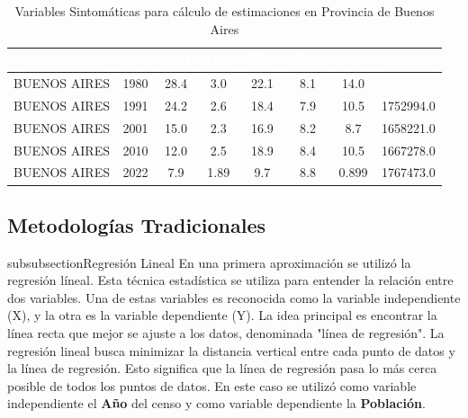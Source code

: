 \documentclass{article}
\theoremstyle{mytheoremstyle}
\theoremstyle{mytheoremstyle}
\theoremstyle{myproblemstyle}
\begin{document}
\begin{table}[htb] %
  \centering
  \begin{tabular}{|c|c|c|c|c|c|c|c|}
  \hline
  \textbf{\cellcolor[rgb]{0,0.231,0.427}\textcolor{white}{Jurisdiccion}} & \textbf{\cellcolor[rgb]{0,0.231,0.427}\textcolor{white}{Año}} & \textbf{\cellcolor[rgb]{0,0.231,0.427}\textcolor{white}{TMI}} & \textbf{\cellcolor[rgb]{0,0.231,0.427}\textcolor{white}{TGF}} & \textbf{\cellcolor[rgb]{0,0.231,0.427}\textcolor{white}{TBN}} & \textbf{\cellcolor[rgb]{0,0.231,0.427}\textcolor{white}{TBM}} & \textbf{\cellcolor[rgb]{0,0.231,0.427}\textcolor{white}{TCV}} & \textbf{\cellcolor[rgb]{0,0.231,0.427}\textcolor{white}{Mat1ria}} \\ \hline
  BUENOS AIRES & 1980 & 28.4 & 3.0 & 22.1 & 8.1 & 14.0 &  \\
  BUENOS AIRES & 1991 & 24.2 & 2.6 & 18.4 & 7.9 & 10.5 & 1752994.0 \\
  BUENOS AIRES & 2001 & 15.0 & 2.3 & 16.9 & 8.2 & 8.7 & 1658221.0 \\
  BUENOS AIRES & 2010 & 12.0 & 2.5 & 18.9 & 8.4 & 10.5 & 1667278.0 \\
  BUENOS AIRES & 2022 & 7.9 & 1.89 & 9.7 & 8.8 & 0.899 & 1767473.0 \\
  \hline
  \end{tabular}
  \caption{Variables Sintomáticas para cálculo de estimaciones en Provincia de Buenos Aires}
  \label{tab:TasasBA}
  \end{table}
  
\subsection{Metodologías Tradicionales}

subsubsection{Regresión Lineal}
  En una primera aproximación se utilizó la regresión líneal. Esta técnica estadística se utiliza para 
  entender la relación entre dos variables. Una de estas variables es reconocida como la variable independiente (X),
   y la otra es la variable dependiente (Y). La idea principal es encontrar la línea recta que mejor se ajuste a los datos, denominada "línea de regresión".
  La regresión lineal busca minimizar la distancia vertical entre cada punto de datos y 
  la línea de regresión. Esto significa que la línea de regresión pasa lo más cerca posible de todos los puntos de datos. \newline\newline
  En este caso se utilizó como variable independiente el \textbf{Año} del censo y 
  como variable dependiente la \textbf{Población}.
\end{document}
